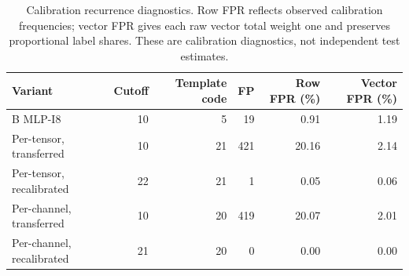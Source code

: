 \begin{table}[H]
\caption{Calibration recurrence diagnostics. Row FPR reflects observed calibration frequencies; vector FPR gives each raw vector total weight one and preserves proportional label shares. These are calibration diagnostics, not independent test estimates.}\label{tab:calibration-recurrence}
\small
\begin{tabularx}{\textwidth}{Xrrrrr}
\toprule
Variant & Cutoff & Template code & FP & Row FPR (\%) & Vector FPR (\%) \\
\midrule
B MLP-I8 & 10 & 5 & 19 & 0.91 & 1.19 \\
Per-tensor, transferred & 10 & 21 & 421 & 20.16 & 2.14 \\
Per-tensor, recalibrated & 22 & 21 & 1 & 0.05 & 0.06 \\
Per-channel, transferred & 10 & 20 & 419 & 20.07 & 2.01 \\
Per-channel, recalibrated & 21 & 20 & 0 & 0.00 & 0.00 \\
\bottomrule
\end{tabularx}
\end{table}
